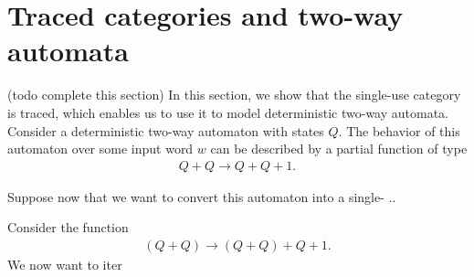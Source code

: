 \section{Traced categories and two-way automata}
\label{sec:two-way-automata}

(todo complete this section)
In this section, we show that the single-use category is traced, which enables us to use it to model deterministic two-way automata. Consider a deterministic two-way automaton with states $Q$. The behavior of this automaton over some input word $w$ can be described by a partial  function of type 
\begin{align*}
Q + Q \to Q + Q + 1.
\end{align*}

Suppose now that we want to convert this automaton into a single- ..


Consider the function 
\begin{align*}
(Q+Q) \to (Q + Q) + Q + 1.
\end{align*}
We now want to iter

